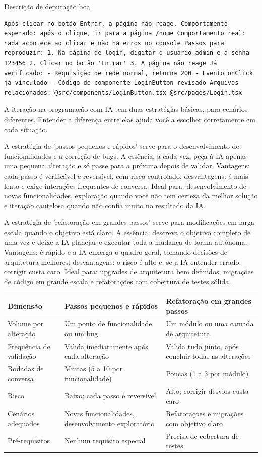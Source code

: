 Descrição de depuração boa

\begin{lstlisting}
Após clicar no botão Entrar, a página não reage. Comportamento esperado: após o clique, ir para a página /home Comportamento real: nada acontece ao clicar e não há erros no console Passos para reproduzir: 1. Na página de login, digitar o usuário admin e a senha 123456 2. Clicar no botão 'Entrar' 3. A página não reage Já verificado: - Requisição de rede normal, retorna 200 - Evento onClick já vinculado - Código do componente LoginButton revisado Arquivos relacionados: @src/components/LoginButton.tsx @src/pages/Login.tsx
\end{lstlisting}


A iteração na programação com IA tem duas estratégias básicas, para cenários diferentes. Entender a diferença entre elas ajuda você a escolher corretamente em cada situação.

A estratégia de 'passos pequenos e rápidos' serve para o desenvolvimento de funcionalidades e a correção de bugs. A essência: a cada vez, peça à IA apenas uma pequena alteração e só passe para a próxima depois de validar. Vantagens: cada passo é verificável e reversível, com risco controlado; desvantagens: é mais lento e exige interações frequentes de conversa. Ideal para: desenvolvimento de novas funcionalidades, exploração quando você não tem certeza da melhor solução e iteração cautelosa quando não confia muito no resultado da IA.

A estratégia de 'refatoração em grandes passos' serve para modificações em larga escala quando o objetivo está claro. A essência: descreva o objetivo completo de uma vez e deixe a IA planejar e executar toda a mudança de forma autônoma. Vantagens: é rápido e a IA enxerga o quadro geral, tomando decisões de arquitetura melhores; desvantagens: o risco é alto e, se a IA entender errado, corrigir custa caro. Ideal para: upgrades de arquitetura bem definidos, migrações de código em grande escala e refatorações com cobertura de testes sólida.

\begin{center}
\begin{tabularx}{\linewidth}{|X|X|X|}
\hline
\textbf{Dimensão} & \textbf{Passos pequenos e rápidos} & \textbf{Refatoração em grandes passos} \tabularnewline
\hline
Volume por alteração & Um ponto de funcionalidade ou um bug & Um módulo ou uma camada de arquitetura \tabularnewline
Frequência de validação & Valida imediatamente após cada alteração & Valida tudo junto, após concluir todas as alterações \tabularnewline
Rodadas de conversa & Muitas (5 a 10 por funcionalidade) & Poucas (1 a 3 por módulo) \tabularnewline
Risco & Baixo; cada passo é reversível & Alto; corrigir desvios custa caro \tabularnewline
Cenários adequados & Novas funcionalidades, desenvolvimento exploratório & Refatorações e migrações com objetivo claro \tabularnewline
Pré-requisitos & Nenhum requisito especial & Precisa de cobertura de testes \tabularnewline
\hline
\end{tabularx}
\end{center}

